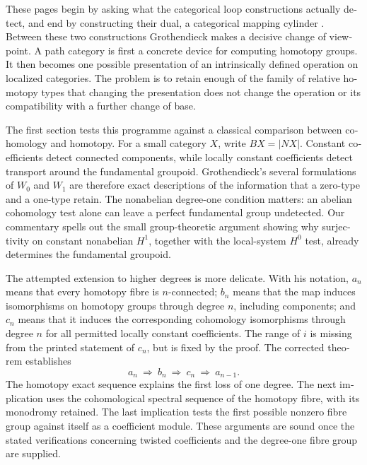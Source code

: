 \begin{otherlanguage}{english}

These pages begin by asking what the categorical loop constructions actually detect, and end by constructing their dual, a categorical mapping cylinder \citep[manuscript pp.~171--234]{Grothendieck1990XIIc}. Between these two constructions Grothendieck makes a decisive change of viewpoint. A path category is first a concrete device for computing homotopy groups. It then becomes one possible presentation of an intrinsically defined operation on localized categories. The problem is to retain enough of the family of relative homotopy types that changing the presentation does not change the operation or its compatibility with a further change of base.

The first section tests this programme against a classical comparison between cohomology and homotopy. For a small category $X$, write $BX=|NX|$. Constant coefficients detect connected components, while locally constant coefficients detect transport around the fundamental groupoid. Grothendieck's several formulations of $W_0$ and $W_1$ are therefore exact descriptions of the information that a zero-type and a one-type retain. The nonabelian degree-one condition matters: an abelian cohomology test alone can leave a perfect fundamental group undetected. Our commentary spells out the small group-theoretic argument showing why surjectivity on constant nonabelian $H^1$, together with the local-system $H^0$ test, already determines the fundamental groupoid.

The attempted extension to higher degrees is more delicate. With his notation, $a_n$ means that every homotopy fibre is $n$-connected; $b_n$ means that the map induces isomorphisms on homotopy groups through degree $n$, including components; and $c_n$ means that it induces the corresponding cohomology isomorphisms through degree $n$ for all permitted locally constant coefficients. The range of $i$ is missing from the printed statement of $c_n$, but is fixed by the proof. The corrected theorem establishes
\[
 a_n\ \Longrightarrow\ b_n\ \Longrightarrow\ c_n\
 \Longrightarrow\ a_{n-1}.
\]
The homotopy exact sequence explains the first loss of one degree. The next implication uses the cohomological spectral sequence of the homotopy fibre, with its monodromy retained. The last implication tests the first possible nonzero fibre group against itself as a coefficient module. These arguments are sound once the stated verifications concerning twisted coefficients and the degree-one fibre group are supplied.


\end{otherlanguage}
